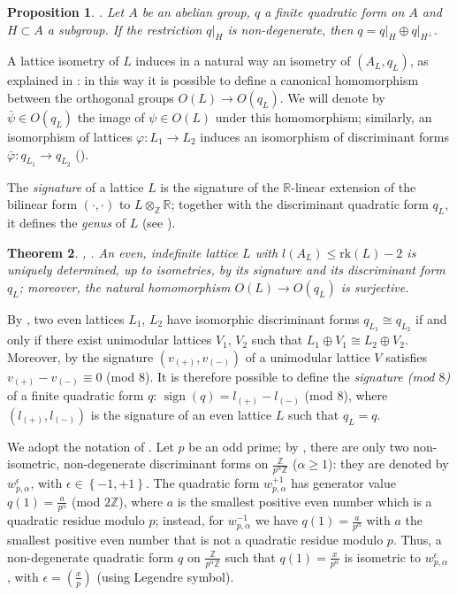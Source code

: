 \documentclass{amsart}
\newtheorem{theorem}{Theorem}[section]
\newtheorem{prop}[theorem]{Proposition}
\theoremstyle{definition}
\newcommand{\ra}{\rightarrow}
\newcommand{\IR}{\mathbb{R}}
\newcommand{\IZ}{\mathbb{Z}}
\newcommand{\rk}{\mathrm{rk}}
\DeclareMathOperator{\signt}{sign}
\begin{document}
\begin{prop}\label{nik 1.2.1} \cite[Proposition 1.2.1]{nikulin}.
 Let $A$ be an abelian group, $q$ a finite quadratic form on $A$ and $H \subset A$ a subgroup. If the restriction $q\vert_H$ is non-degenerate, then $q = q\vert_H \oplus q\vert_{H^\perp}$.
\end{prop}

A lattice isometry of $L$ induces in a natural way an isometry of $\left(A_L, q_L \right)$, as explained in \cite[\S 1.2]{dolgachev}: in this way it is possible to define a canonical homomorphism between the orthogonal groups $O(L) \ra O(q_L)$. We will denote by $\bar{\psi} \in O(q_L)$ the image of $\psi \in O(L)$ under this homomorphism; similarly, an isomorphism of lattices $\varphi: L_1 \ra L_2$ induces an isomorphism of discriminant forms $\bar{\varphi}: q_{L_1} \ra q_{L_2}$ (\cite[\S 1.4]{nikulin}).

The \emph{signature} of a lattice $L$ is the signature of the $\IR$-linear extension of the bilinear form $(\cdot, \cdot )$ to $L \otimes_{\IZ} \IR$; together with the discriminant quadratic form $q_L$, it defines the \emph{genus} of $L$ (see \cite[\S 1]{nikulin}).

\begin{theorem}\label{l<rk-2} \cite[Proposition 1.4.7]{dolgachev}, \cite[Theorem 2.2]{morrison}.
An even, indefinite lattice $L$ with $l(A_L) \leq \rk(L)-2$ is uniquely determined, up to isometries, by its signature and its discriminant form $q_L$; moreover, the natural homomorphism $O(L) \ra O(q_L)$ is surjective.
\end{theorem} 

By \cite[Theorem 1.3.1]{nikulin}, two even lattices $L_1$, $L_2$ have isomorphic discriminant forms $q_{L_1} \cong q_{L_2}$ if and only if there exist unimodular lattices $V_1$, $V_2$ such that $L_1 \oplus V_1 \cong L_2 \oplus V_2$. Moreover, by \cite[Theorem 1.1.1(a)]{nikulin} the signature $(v_{(+)}, v_{(-)})$ of a unimodular lattice $V$ satisfies $v_{(+)}-v_{(-)} \equiv 0$ (mod $8$). It is therefore possible to define the \emph{signature (mod $8$)} of a finite quadratic form $q$: $\signt(q) = l_{(+)} - l_{(-)}$ (mod $8$), where $(l_{(+)}, l_{(-)})$ is the signature of an even lattice $L$ such that $q_L = q$.

We adopt the notation of \cite{brieskorn}. Let $p$ be an odd prime; by \cite[Proposition 1.8.1]{nikulin}, there are only two non-isometric, non-degenerate discriminant forms on $\frac{\IZ}{p^\alpha \IZ}$ ($\alpha \geq 1$): they are denoted by $w^\epsilon_{p,\alpha}$, with $\epsilon \in \left\{ -1, +1\right\}$. The quadratic form $w^{+1}_{p,\alpha}$ has generator value $q(1) = \frac{a}{p^\alpha}$ (mod $2 \IZ$), where $a$ is the smallest positive even number which is a quadratic residue modulo $p$; instead, for $w^{-1}_{p,\alpha}$ we have $q(1) = \frac{a}{p^\alpha}$ with $a$ the smallest positive even number that is not a quadratic residue modulo $p$. Thus, a non-degenerate quadratic form $q$ on $\frac{\IZ}{p^\alpha \IZ}$ such that $q(1) = \frac{x}{p^\alpha}$ is isometric to $w^{\epsilon}_{p,\alpha}$ , with $\epsilon = (\frac{x}{p})$ (using Legendre symbol).
\end{document}
